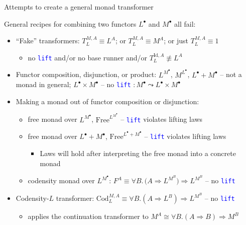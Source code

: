 \documentclass[english]{beamer}
\begin{document}
\begin{frame}{Attempts to create a general monad transformer}

{\footnotesize{}\vspace{-0.1cm}}General recipes for combining two
functors $L^{\bullet}$ and $M^{\bullet}$ all fail:
\begin{itemize}
\item ``Fake'' transformers: $T_{L}^{M,A}\equiv L^{A}$; or $T_{L}^{M,A}\equiv M^{A}$;
or just $T_{L}^{M,A}\equiv1$
\begin{itemize}
\item no \texttt{\textcolor{blue}{\footnotesize{}lift}} and/or no base runner
and/or $T_{L}^{\text{Id},A}\not\equiv L^{A}$
\end{itemize}
\item Functor composition, disjunction, or product: $L^{M^{\bullet}}$,
$M^{L^{\bullet}}$, $L^{\bullet}+M^{\bullet}$ -- not a monad in
general; $L^{\bullet}\times M^{\bullet}$ -- no \texttt{\textcolor{blue}{\footnotesize{}lift}}
$:M^{\bullet}\leadsto L^{\bullet}\times M^{\bullet}$
\item Making a monad out of functor composition or disjunction:
\begin{itemize}
\item free monad over $L^{M^{\bullet}}$, $\text{Free}^{L^{M^{\bullet}}}$
-- \texttt{\textcolor{blue}{\footnotesize{}lift}} violates lifting
laws
\item free monad over $L^{\bullet}+M^{\bullet}$, $\text{Free}^{L^{\bullet}+M^{\bullet}}$
-- \texttt{\textcolor{blue}{\footnotesize{}lift}} violates lifting
laws
\begin{itemize}
\item Laws will hold after interpreting the free monad into a concrete monad
\end{itemize}
\item codensity monad over $L^{M^{\bullet}}$: $F^{A}\equiv\forall B.\,\big(A\Rightarrow L^{M^{B}}\big)\Rightarrow L^{M^{B}}$
-- no \texttt{\textcolor{blue}{\footnotesize{}lift}} 
\end{itemize}
\item Codensity-$L$ transformer: $\text{Cod}_{L}^{M,A}\equiv\forall B.\left(A\Rightarrow L^{B}\right)\Rightarrow L^{M^{B}}$
-- no \texttt{\textcolor{blue}{\footnotesize{}lift}} 
\begin{itemize}
\item applies the continuation transformer to $M^{A}\cong\forall B.\left(A\Rightarrow B\right)\Rightarrow M^{B}$
\end{itemize}

\end{itemize}
\end{frame}
\end{document}
